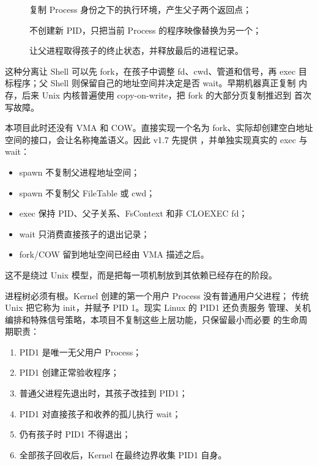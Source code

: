 \begin{description}
  \item[] 复制 Process 身份之下的执行环境，产生父子两个返回点；
  \item[] 不创建新 PID，只把当前 Process 的程序映像替换为另一个；
  \item[] 让父进程取得孩子的终止状态，并释放最后的进程记录。
\end{description}

这种分离让 Shell 可以先 fork，在孩子中调整 fd、cwd、管道和信号，再 exec
目标程序；父 Shell 则保留自己的地址空间并决定是否 wait。早期机器真正复制
内存，后来 Unix 内核普遍使用 copy-on-write，把 fork 的大部分页复制推迟到
首次写故障。

本项目此时还没有 VMA 和 COW。直接实现一个名为 fork、实际却创建空白地址
空间的接口，会让名称掩盖语义。因此 v1.7 先提供 ，并单独实现真实的 exec 与 wait：

\begin{itemize}
  \item spawn 不复制父进程地址空间；
  \item spawn 不复制父 FileTable 或 cwd；
  \item exec 保持 PID、父子关系、FsContext 和非 CLOEXEC fd；
  \item wait 只消费直接孩子的退出记录；
  \item fork/COW 留到地址空间已经由 VMA 描述之后。
\end{itemize}

这不是绕过 Unix 模型，而是把每一项机制放到其依赖已经存在的阶段。

进程树必须有根。Kernel 创建的第一个用户 Process 没有普通用户父进程；
传统 Unix 把它称为 init，并赋予 PID 1。现实 Linux 的 PID1 还负责服务
管理、关机编排和特殊信号策略，本项目不复制这些上层功能，只保留最小而必要
的生命周期职责：

\begin{enumerate}
  \item PID1 是唯一无父用户 Process；
  \item PID1 创建正常验收程序；
  \item 普通父进程先退出时，其孩子改挂到 PID1；
  \item PID1 对直接孩子和收养的孤儿执行 wait；
  \item 仍有孩子时 PID1 不得退出；
  \item 全部孩子回收后，Kernel 在最终边界收集 PID1 自身。
\end{enumerate}

